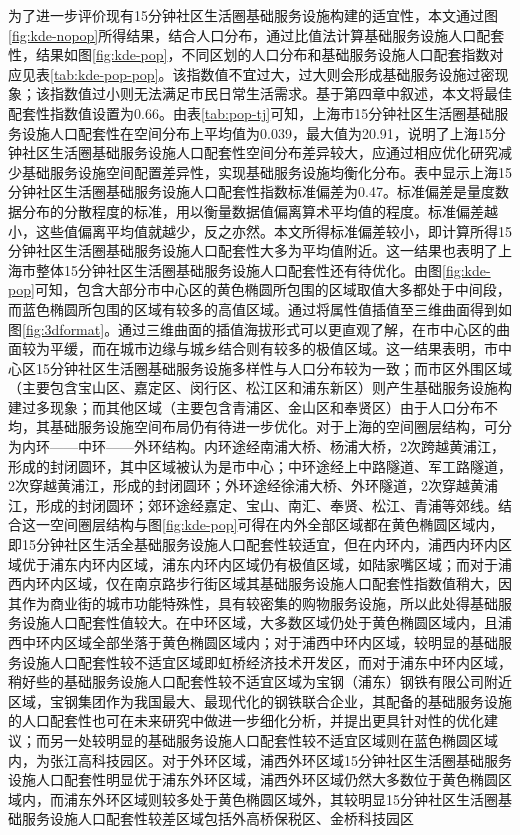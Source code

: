 \documentclass{shnuthesis}
\begin{document}

为了进一步评价现有15分钟社区生活圈基础服务设施构建的适宜性，本文通过图\ref{fig:kde-nopop}所得结果，结合人口分布，通过比值法计算基础服务设施人口配套性，结果如图\ref{fig:kde-pop}，不同区划的人口分布和基础服务设施人口配套指数对应见表\ref{tab:kde-pop-pop}。该指数值不宜过大，过大则会形成基础服务设施过密现象；该指数值过小则无法满足市民日常生活需求。基于第四章中叙述，本文将最佳配套性指数值设置为0.66。由表\ref{tab:pop-tj}可知，上海市15分钟社区生活圈基础服务设施人口配套性在空间分布上平均值为0.039，最大值为20.91，说明了上海15分钟社区生活圈基础服务设施人口配套性空间分布差异较大，应通过相应优化研究减少基础服务设施空间配置差异性，实现基础服务设施均衡化分布。表中显示上海15分钟社区生活圈基础服务设施人口配套性指数标准偏差为0.47。标准偏差是量度数据分布的分散程度的标准，用以衡量数据值偏离算术平均值的程度。标准偏差越小，这些值偏离平均值就越少，反之亦然。本文所得标准偏差较小，即计算所得15分钟社区生活圈基础服务设施人口配套性大多为平均值附近。这一结果也表明了上海市整体15分钟社区生活圈基础服务设施人口配套性还有待优化。由图\ref{fig:kde-pop}可知，包含大部分市中心区的黄色椭圆所包围的区域取值大多都处于中间段，而蓝色椭圆所包围的区域有较多的高值区域。通过将属性值插值至三维曲面得到如图\ref{fig:3dformat}。通过三维曲面的插值海拔形式可以更直观了解，在市中心区的曲面较为平缓，而在城市边缘与城乡结合则有较多的极值区域。这一结果表明，市中心区15分钟社区生活圈基础服务设施多样性与人口分布较为一致；而市区外围区域（主要包含宝山区、嘉定区、闵行区、松江区和浦东新区）则产生基础服务设施构建过多现象；而其他区域（主要包含青浦区、金山区和奉贤区）由于人口分布不均，其基础服务设施空间布局仍有待进一步优化。对于上海的空间圈层结构，可分为内环——中环——外环结构。内环途经南浦大桥、杨浦大桥，2次跨越黄浦江，形成的封闭圆环，其中区域被认为是市中心；中环途经上中路隧道、军工路隧道，2次穿越黄浦江，形成的封闭圆环；外环途经徐浦大桥、外环隧道，2次穿越黄浦江，形成的封闭圆环；郊环途经嘉定、宝山、南汇、奉贤、松江、青浦等郊线。结合这一空间圈层结构与图\ref{fig:kde-pop}可得在内外全部区域都在黄色椭圆区域内，即15分钟社区生活全基础服务设施人口配套性较适宜，但在内环内，浦西内环内区域优于浦东内环内区域，浦东内环内区域仍有极值区域，如陆家嘴区域；而对于浦西内环内区域，仅在南京路步行街区域其基础服务设施人口配套性指数值稍大，因其作为商业街的城市功能特殊性，具有较密集的购物服务设施，所以此处得基础服务设施人口配套性值较大。在中环区域，大多数区域仍处于黄色椭圆区域内，且浦西中环内区域全部坐落于黄色椭圆区域内；对于浦西中环内区域，较明显的基础服务设施人口配套性较不适宜区域即虹桥经济技术开发区，而对于浦东中环内区域，稍好些的基础服务设施人口配套性较不适宜区域为宝钢（浦东）钢铁有限公司附近区域，宝钢集团作为我国最大、最现代化的钢铁联合企业，其配备的基础服务设施的人口配套性也可在未来研究中做进一步细化分析，并提出更具针对性的优化建议；而另一处较明显的基础服务设施人口配套性较不适宜区域则在蓝色椭圆区域内，为张江高科技园区。对于外环区域，浦西外环区域15分钟社区生活圈基础服务设施人口配套性明显优于浦东外环区域，浦西外环区域仍然大多数位于黄色椭圆区域内，而浦东外环区域则较多处于黄色椭圆区域外，其较明显15分钟社区生活圈基础服务设施人口配套性较差区域包括外高桥保税区、金桥科技园区
\end{document}

